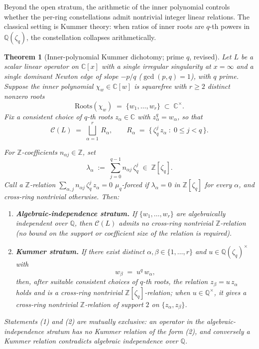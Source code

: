 \documentclass[11pt,a4paper]{article}
\theoremstyle{plain}
\newtheorem{theorem}{Theorem}[section]
\theoremstyle{definition}
\theoremstyle{remark}
\newcommand{\Roots}{\mathrm{Roots}}
\newcommand{\Cl}{\mathcal{C}}
\newcommand{\Zlc}{\mathbb{Z}[\zeta_q]}
\newcommand{\Qlc}{\mathbb{Q}(\zeta_q)}
\begin{document}
Beyond the open stratum, the arithmetic of the inner polynomial controls
whether the per-ring constellations admit nontrivial integer linear
relations. The classical setting is Kummer theory: when ratios of inner
roots are $q$-th powers in $\mathbb{Q}(\zeta_q)$, the constellation
collapses arithmetically.

\begin{theorem}[Inner-polynomial Kummer dichotomy; prime $q$,
revised]\label{thm:D2}
Let $L$ be a scalar linear operator on $\mathbb{C}[x]$ with a single
irregular singularity at $x = \infty$ and a single dominant Newton edge
of slope $-p/q$ ($\gcd(p, q) = 1$), with $q$ prime. Suppose the inner
polynomial $\chi_w \in \mathbb{C}[w]$ is squarefree with
$r \ge 2$ distinct nonzero roots
\[
   \Roots(\chi_w) \;=\; \{w_1, \dots, w_r\} \;\subset\;
   \mathbb{C}^\times.
\]
Fix a consistent choice of $q$-th roots $z_\alpha \in \mathbb{C}$
with $z_\alpha^q = w_\alpha$, so that
\[
   \Cl(L) \;=\; \bigsqcup_{\alpha = 1}^{r}\, R_\alpha,
   \qquad
   R_\alpha \;=\; \big\{\,\zeta_q^j\, z_\alpha\;:\; 0 \le j < q\,\big\}.
\]

For $\mathbb{Z}$-coefficients $n_{\alpha j} \in \mathbb{Z}$, set
\[
   \lambda_\alpha \;:=\; \sum_{j = 0}^{q-1} n_{\alpha j}\, \zeta_q^j
   \;\in\; \Zlc.
\]
Call a $\mathbb{Z}$-relation $\sum_{\alpha, j} n_{\alpha j}\, \zeta_q^j\,
z_\alpha = 0$ \emph{$\mu_q$-forced} if $\lambda_\alpha = 0$ in $\Zlc$
for every $\alpha$, and \emph{cross-ring nontrivial} otherwise. Then:
\begin{enumerate}[leftmargin=2em]
\item \textbf{Algebraic-independence stratum.} If $\{w_1, \dots, w_r\}$
are algebraically independent over $\mathbb{Q}$, then $\Cl(L)$ admits
\emph{no} cross-ring nontrivial $\mathbb{Z}$-relation (no bound on
the support or coefficient size of the relation is required).
\item \textbf{Kummer stratum.} If there exist distinct
$\alpha, \beta \in \{1, \dots, r\}$ and $u \in \Qlc^\times$ with
\[
   w_\beta \;=\; u^q\, w_\alpha,
\]
then, after suitable consistent choices of $q$-th roots, the relation
$z_\beta = u\, z_\alpha$ holds and is a cross-ring nontrivial
$\Zlc$-relation; when $u \in \mathbb{Q}^\times$, it gives a
cross-ring nontrivial $\mathbb{Z}$-relation of support $2$ on
$\{z_\alpha, z_\beta\}$.
\end{enumerate}
Statements (1) and (2) are mutually exclusive: an operator in the
algebraic-independence stratum has no Kummer relation of the form (2),
and conversely a Kummer relation contradicts algebraic independence
over $\mathbb{Q}$.
\end{theorem}
\end{document}
